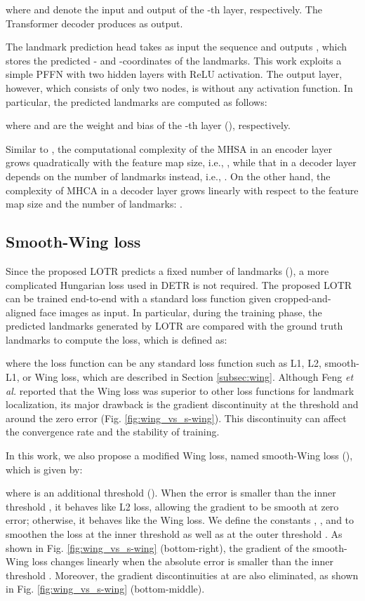 \documentclass[journal]{IEEEtran}
\begin{document}
where  and  denote the input and output of the -th layer, respectively.
The Transformer decoder produces  as output.

The landmark prediction head takes as input the sequence  and outputs , which stores the predicted - and -coordinates of the  landmarks.
This work exploits a simple PFFN with two hidden layers with ReLU activation. 
The output layer, however, which consists of only two nodes, is without any activation function. 
In particular, the predicted landmarks  are computed as follows:

where  and  are the weight and bias of the -th layer (), respectively.

Similar to \cite{Carion2020}, the computational complexity of the MHSA in an encoder layer grows quadratically with the feature map size, i.e., , while that in a decoder layer depends on the number of landmarks instead, i.e., . On the other hand, the complexity of MHCA in a decoder layer grows linearly with respect to the feature map size and the number of landmarks: .


\subsection{Smooth-Wing loss}\label{subsec:loss}

Since the proposed LOTR predicts a fixed number of landmarks (), a more complicated Hungarian loss used in DETR \cite{Carion2020} is not required. 
The proposed LOTR can be trained end-to-end with a standard loss function given cropped-and-aligned face images as input.
In particular, during the training phase, the predicted landmarks  generated by LOTR are compared with the ground truth landmarks  to compute the loss, which is defined as:

where the loss function  can be any standard loss function such as L1, L2, smooth-L1, or Wing loss, which are described in Section \ref{subsec:wing}. 
Although Feng \textit{et al.} \cite{Feng2017} reported that the Wing loss was superior to other loss functions for landmark localization, its major drawback is the gradient discontinuity at the threshold  and around the zero error (Fig. \ref{fig:wing_vs_s-wing}). 
This discontinuity can affect the convergence rate and the stability of training.

In this work, we also propose a modified Wing loss, named smooth-Wing loss (), which is given by:




where  is an additional threshold ().
When the error is smaller than the inner threshold , it behaves like L2 loss, allowing the gradient to be smooth at zero error; otherwise, it behaves like the Wing loss. 
We define the constants , , and  to smoothen the loss at the inner threshold  as well as at the outer threshold . 
As shown in Fig. \ref{fig:wing_vs_s-wing} (bottom-right), the gradient of the smooth-Wing loss changes linearly when the absolute error  is smaller than the inner threshold . 
Moreover, the gradient discontinuities at  are also eliminated, as shown in Fig. \ref{fig:wing_vs_s-wing} (bottom-middle).
\end{document}
